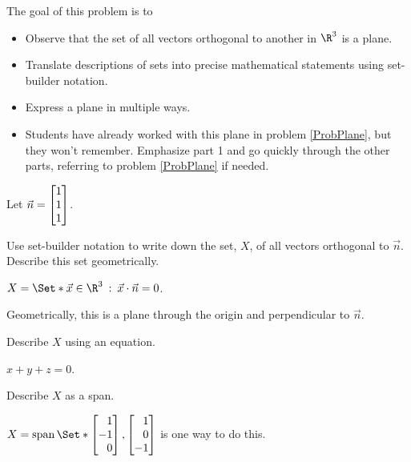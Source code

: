 	\bookonlynewpage
	\question
	\begin{annotation}
		\begin{goals}

			The goal of this problem is to
			\begin{itemize}
				\item Observe that the set of all vectors orthogonal to another in $\R^3$
					is a plane.
				\item Translate descriptions of sets into precise mathematical statements using
					set-builder notation.
				\item Express a plane in multiple ways.
			\end{itemize}
		\end{goals}

		\begin{notes}
			\begin{itemize}
				\item Students have already worked with this plane in problem \ref{ProbPlane},
					but they won't remember. Emphasize part 1 and go quickly through the other parts,
					referring to problem \ref{ProbPlane} if needed.
			\end{itemize}
		\end{notes}
	\end{annotation}
	Let $\vec n=\mat{1\\1\\1}$.
	\begin{parts}
		\item Use set-builder notation to write down the set, $X$, of
			all vectors orthogonal to $\vec n$. Describe this set
			geometrically.
			\begin{solution}
				$X = \Set*{\vec x\in \R^3 \given \vec x\cdot \vec n = 0}$.

				Geometrically, this is a plane through the origin and
				perpendicular to $\vec n$.
			\end{solution}
		\item Describe $X$ using an equation.
			\begin{solution}[inline]
				$x+y+z=0$.
			\end{solution}
		\item Describe $X$ as a span.
			\begin{solution}[inline]
				$X = \Span\Set*{\mat{1\\-1\\0},\mat{1\\0\\-1}}$ is one way to do this.
			\end{solution}
	\end{parts}



